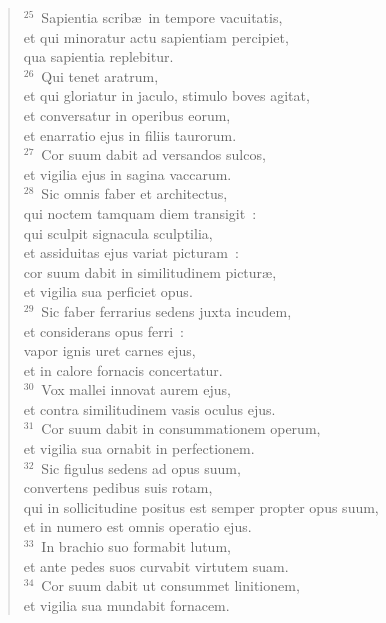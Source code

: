 \begin{flushleft}\begin{verse}${}^{25}$~Sapientia scrib\ae\ in tempore vacuitatis,\\ et qui minoratur actu sapientiam percipiet,\\ qua sapientia replebitur.\\
${}^{26}$~Qui tenet aratrum,\\ et qui gloriatur in jaculo, stimulo boves agitat,\\ et conversatur in operibus eorum,\\ et enarratio ejus in filiis taurorum.\\
${}^{27}$~Cor suum dabit ad versandos sulcos,\\ et vigilia ejus in sagina vaccarum.\\
${}^{28}$~Sic omnis faber et architectus,\\ qui noctem tamquam diem transigit~:\\ qui sculpit signacula sculptilia,\\ et assiduitas ejus variat picturam~:\\ cor suum dabit in similitudinem pictur\ae ,\\ et vigilia sua perficiet opus.\\
${}^{29}$~Sic faber ferrarius sedens juxta incudem,\\ et considerans opus ferri~:\\ vapor ignis uret carnes ejus,\\ et in calore fornacis concertatur.\\
${}^{30}$~Vox mallei innovat aurem ejus,\\ et contra similitudinem vasis oculus ejus.\\
${}^{31}$~Cor suum dabit in consummationem operum,\\ et vigilia sua ornabit in perfectionem.\\
${}^{32}$~Sic figulus sedens ad opus suum,\\ convertens pedibus suis rotam,\\ qui in sollicitudine positus est semper propter opus suum,\\ et in numero est omnis operatio ejus.\\
${}^{33}$~In brachio suo formabit lutum,\\ et ante pedes suos curvabit virtutem suam.\\
${}^{34}$~Cor suum dabit ut consummet linitionem,\\ et vigilia sua mundabit fornacem.\\

\end{verse}
\end{flushleft}
